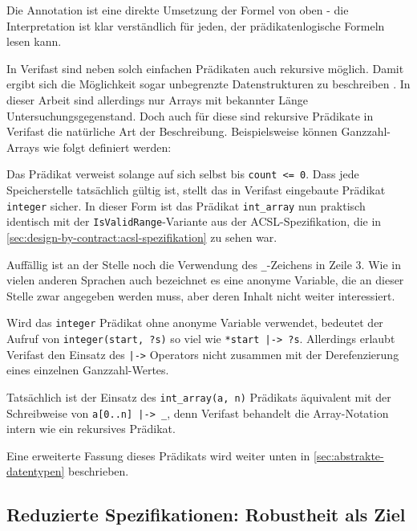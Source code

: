 Die Annotation ist eine direkte Umsetzung der Formel von oben - die Interpretation ist klar verständlich für 
jeden, der prädikatenlogische Formeln lesen kann.

In Verifast sind neben solch einfachen Prädikaten auch rekursive möglich. Damit ergibt sich die Möglichkeit
sogar unbegrenzte Datenstrukturen zu beschreiben . In dieser
Arbeit sind allerdings nur Arrays mit bekannter Länge Untersuchungsgegenstand. Doch auch für diese sind
rekursive Prädikate in Verifast die natürliche Art der Beschreibung. Beispielsweise können Ganzzahl-Arrays
wie folgt definiert werden:


 
Das Prädikat verweist solange auf sich selbst bis \lstinline{count <= 0}. Dass jede Speicherstelle tatsächlich
gültig ist, stellt das in Verifast eingebaute Prädikat \lstinline{integer} sicher. In dieser Form ist das Prädikat
\lstinline{int_array} nun praktisch identisch mit der \lstinline{IsValidRange}-Variante aus der ACSL-Spezifikation, 
die in \ref{sec:design-by-contract:acsl-spezifikation} zu sehen war.

Auffällig ist an der Stelle noch die Verwendung des \lstinline{_}-Zeichens in Zeile 3. Wie in vielen anderen 
Sprachen auch bezeichnet es eine anonyme Variable, die an dieser Stelle zwar angegeben werden muss, aber deren 
Inhalt nicht weiter interessiert. 

Wird das \lstinline{integer} Prädikat ohne anonyme Variable verwendet, bedeutet der Aufruf von 
\lstinline{integer(start, ?s)} so viel wie \lstinline{*start |-> ?s}. Allerdings erlaubt Verifast
den Einsatz des \lstinline{|->} Operators nicht zusammen mit der Derefenzierung eines einzelnen
Ganzzahl-Wertes.

Tatsächlich ist der Einsatz des \lstinline{int_array(a, n)} Prädikats äquivalent mit der Schreibweise 
von \lstinline{a[0..n] |-> _}, denn Verifast behandelt die Array-Notation intern wie ein rekursives
Prädikat.

Eine erweiterte Fassung dieses Prädikats wird weiter unten in 
\ref{sec:abstrakte-datentypen} beschrieben.



\subsection{Reduzierte Spezifikationen: Robustheit als Ziel}
\label{sec:design-by-contract:partielle-korrektheit}

